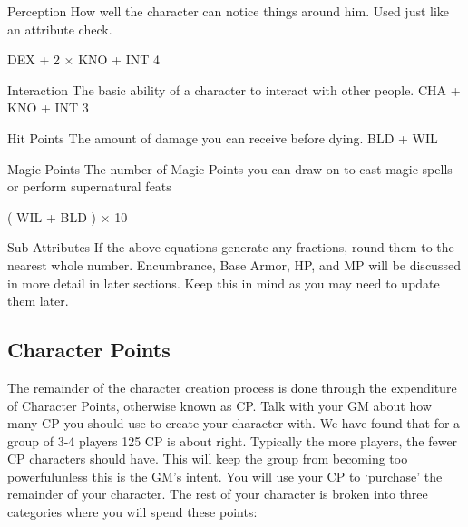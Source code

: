 \documentclass[twoside]{book}
\begin{document}
                  
                  
                   Perception   
                     How well the character can notice things
                     around him. Used just like an attribute check.
                     
                             DEX  +
                        2  \ensuremath{\times}    KNO
                      +    INT      4
                         
                    
                  
                  
                   Interaction   
                     The basic ability of a character to interact
                     with other people. 
                           CHA  +
                      KNO  +  INT 
                       3     
                    
                  
                  
                   Hit Points   
                     The amount of damage you can receive before
                     dying. 
                       BLD  +  WIL
                     
                    
                  
                  
                   Magic Points   
                     The number of Magic Points you can draw on to
                     cast magic spells or perform supernatural feats
                     
                           (    WIL  
                      +    BLD    )   
                     \ensuremath{\times}    10     
                    
                  
                
              Sub-Attributes  
             If the above equations generate any fractions, round
               them to the nearest whole number.  Encumbrance, Base Armor, HP, and MP will be
               discussed in more detail in later sections. Keep this in
               mind as you may need to update them later. 
\subsection{Character Points}
     The remainder of the character creation process is
               done through the expenditure of Character Points,
               otherwise known as CP. Talk with your GM about how many CP
               you should use to create your character with. We have
               found that for a group of 3-4 players 125 CP is about
               right. Typically the more players, the fewer CP characters
               should have. This will keep the group from becoming too
               powerfulunless this is the GM's intent.
                You will use your CP to `purchase' the
               remainder of your character. The rest of your character is
               broken into three categories where you will spend these
               points:   
                
\end{document}
